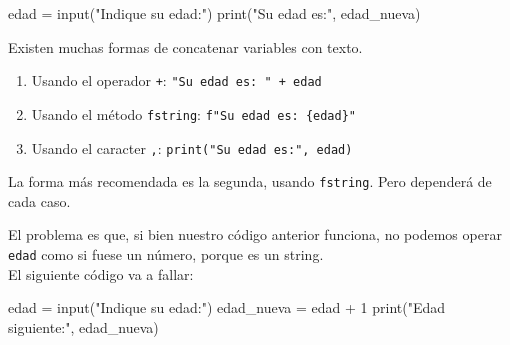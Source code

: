 \documentclass[
  letterpaper,
  DIV=11,
  numbers=noendperiod]{scrreprt}
\newenvironment{Shaded}{\begin{snugshade}}{\end{snugshade}}
\newcommand{\BuiltInTok}[1]{\textcolor[rgb]{0.00,0.23,0.31}{#1}}
\newcommand{\DecValTok}[1]{\textcolor[rgb]{0.68,0.00,0.00}{#1}}
\newcommand{\NormalTok}[1]{\textcolor[rgb]{0.00,0.23,0.31}{#1}}
\newcommand{\OperatorTok}[1]{\textcolor[rgb]{0.37,0.37,0.37}{#1}}
\newcommand{\StringTok}[1]{\textcolor[rgb]{0.13,0.47,0.30}{#1}}
\providecommand{\tightlist}{%
  \setlength{\itemsep}{0pt}\setlength{\parskip}{0pt}}\usepackage{longtable,booktabs,array}
\begin{document}
\begin{Shaded}
\begin{Highlighting}[]
\NormalTok{edad }\OperatorTok{=} \BuiltInTok{input}\NormalTok{(}\StringTok{"Indique su edad:"}\NormalTok{)}
\BuiltInTok{print}\NormalTok{(}\StringTok{"Su edad es:"}\NormalTok{, edad\_nueva)}
\end{Highlighting}
\end{Shaded}

\begin{tcolorbox}[enhanced jigsaw, colframe=quarto-callout-tip-color-frame, opacityback=0, opacitybacktitle=0.6, bottomrule=.15mm, toprule=.15mm, coltitle=black, breakable, colback=white, leftrule=.75mm, titlerule=0mm, bottomtitle=1mm, toptitle=1mm, rightrule=.15mm, title=\textcolor{quarto-callout-tip-color}{\faLightbulb}\hspace{0.5em}{Imprimiendo Strings y Variables (Iterpolación de Cadenas)}, arc=.35mm, left=2mm, colbacktitle=quarto-callout-tip-color!10!white]

Existen muchas formas de concatenar variables con texto.

\begin{enumerate}
\def\labelenumi{\arabic{enumi}.}
\tightlist
\item
  Usando el operador \texttt{+}: \texttt{"Su\ edad\ es:\ "\ +\ edad}
\item
  Usando el método \texttt{fstring}: \texttt{f"Su\ edad\ es:\ \{edad\}"}
\item
  Usando el caracter \texttt{,}: \texttt{print("Su\ edad\ es:",\ edad)}
\end{enumerate}

La forma más recomendada es la segunda, usando \texttt{fstring}. Pero
dependerá de cada caso.

\end{tcolorbox}

El problema es que, si bien nuestro código anterior funciona, no podemos
operar \texttt{edad} como si fuese un número, porque es un string.\\
El siguiente código va a fallar:

\begin{Shaded}
\begin{Highlighting}[]
\NormalTok{edad }\OperatorTok{=} \BuiltInTok{input}\NormalTok{(}\StringTok{"Indique su edad:"}\NormalTok{)}
\NormalTok{edad\_nueva }\OperatorTok{=}\NormalTok{ edad }\OperatorTok{+} \DecValTok{1}
\BuiltInTok{print}\NormalTok{(}\StringTok{"Edad siguiente:"}\NormalTok{, edad\_nueva)}
\end{Highlighting}
\end{Shaded}
\end{document}
